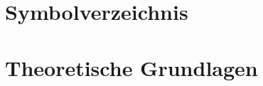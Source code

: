 \documentclass[%
	BCOR12mm, %
	cleardoublepage=empty, %
	tablecaptionabove, %
	toc=bib, %
	toc=listofnumbered, %
	listof=leveldown, %
	numbers=noendperiod %
	]{scrbook}
\begin{document}

\frontmatter

\tableofcontents
\chapter{Symbolverzeichnis} %
\label{cha:symbolverzeichnis}


\mainmatter


\chapter{Theoretische Grundlagen} %
\label{cha:theoretische_grundlagen}
\cite{pradipasena2007temperature}


\citep{gaukel2004untersuchungen}

\citet{young1957d}
\end{document}
